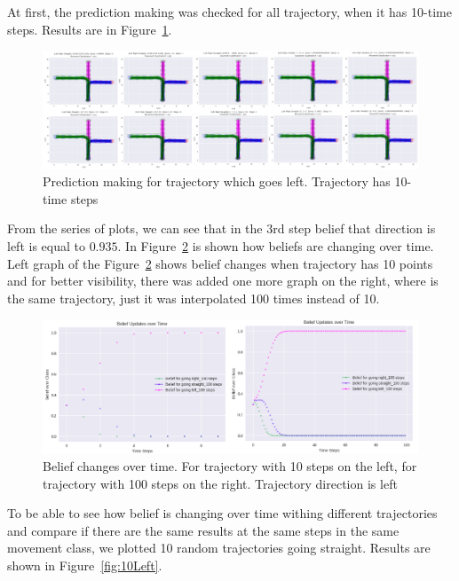 At first, the prediction making was checked for all trajectory, when it has 10-time steps. Results are in Figure~\ref{fig:leftPrediction}. 

\begin{figure}[H]
	\centering  	
	\includegraphics[width=18cm]{img/0_prediction_left.PNG}
	\caption{Prediction making for trajectory which goes left. Trajectory has 10-time steps}
	\label{fig:leftPrediction}    
\end{figure}

From the series of plots, we can see that in the 3rd step belief that direction is left is equal to $0.935$. In Figure~\ref{fig:CompareLeft} is shown how beliefs are changing over time. Left graph of the Figure~\ref{fig:CompareLeft} shows belief changes when trajectory has 10 points and for better visibility, there was added one more graph on the right, where is the same trajectory, just it was interpolated 100 times instead of 10.

\begin{figure}[H]
	\centering  	
	\includegraphics[width=15cm]{img/10_100_compared_left.jpg}
	\caption{Belief changes over time. For trajectory with 10 steps on the left, for trajectory with 100 steps on the right. Trajectory direction is left}
	\label{fig:CompareLeft}    
\end{figure}

To be able to see how belief is changing over time withing different trajectories and compare if there are the same results at the same steps in the same movement class, we plotted 10 random trajectories going straight. Results are shown in Figure~\ref{fig:10Left}.

